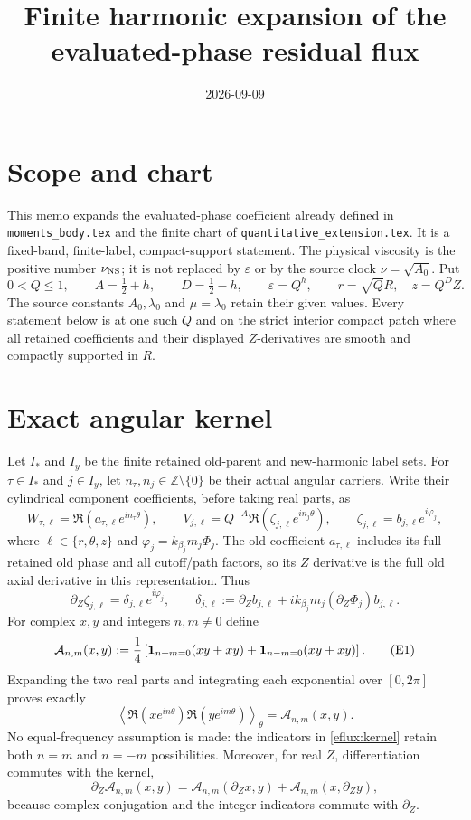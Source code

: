 \documentclass[11pt]{article}
\title{Finite harmonic expansion of the evaluated-phase residual flux}
\author{}
\date{2026-09-09}
\begin{document}
\maketitle
\small
\section{Scope and chart}
This memo expands the evaluated-phase coefficient already defined in
\texttt{moments\_body.tex} and the finite chart of
\texttt{quantitative\_extension.tex}.  It is a fixed-band, finite-label,
compact-support statement.  The physical viscosity is the positive number
$\nu_{\rm NS}$; it is not replaced by $\varepsilon$ or by the source clock
$\nu=\sqrt{A_0}$.  Put
\[
 0<Q\leq1,\qquad A=\tfrac12+h,\qquad D=\tfrac12-h,
 \qquad \varepsilon=Q^h,
 \qquad r=\sqrt Q R,\quad z=Q^D Z.
\]
The source constants $A_0,\lambda_0$ and $\mu=\lambda_0$ retain their given
values.  Every statement below is at one such $Q$ and on the strict interior
compact patch where all retained coefficients and their displayed
$Z$-derivatives are smooth and compactly supported in $R$.

\section{Exact angular kernel}
Let $I_*$ and $I_y$ be the finite retained old-parent and new-harmonic label
sets.  For $\tau\in I_*$ and $j\in I_y$, let $n_\tau,n_j\in\mathbb Z\setminus\{0\}$
be their actual angular carriers.  Write their cylindrical component
coefficients, before taking real parts, as
\[
 W_{\tau,\ell}=\Re(a_{\tau,\ell}e^{in_\tau\theta}),\qquad
 V_{j,\ell}=Q^{-A}\Re(\zeta_{j,\ell}e^{in_j\theta}),
 \qquad \zeta_{j,\ell}=b_{j,\ell}e^{i\varphi_j},
\]
where $\ell\in\{r,\theta,z\}$ and
$\varphi_j=k_{\beta_j}m_j\Phi_j$.  The old coefficient $a_{\tau,\ell}$ includes its full retained old phase and all cutoff/path factors, so its $Z$ derivative is the full old axial derivative in this representation.  Thus
\[
 \partial_Z\zeta_{j,\ell}=\delta_{j,\ell}e^{i\varphi_j},
 \qquad
 \delta_{j,\ell}:=\partial_Zb_{j,\ell}
       +ik_{\beta_j}m_j(\partial_Z\Phi_j)b_{j,\ell}.
\]
For complex $x,y$ and integers $n,m\ne0$ define
\[
 \mathcal A_{n,m}(x,y):=\frac14\left[
 {\bf1}_{n+m=0}(xy+\bar x\bar y)
 +{\bf1}_{n-m=0}(x\bar y+\bar x y)\right].
 \tag{E1}\label{eflux:kernel}
\]
Expanding the two real parts and integrating each exponential over
$[0,2\pi]$ proves exactly
\[
 \left\langle\Re(xe^{in\theta})\Re(ye^{im\theta})\right\rangle_\theta
 =\mathcal A_{n,m}(x,y).
 \tag{E2}\label{eflux:angular}
\]
No equal-frequency assumption is made: the indicators in
\eqref{eflux:kernel} retain both $n=m$ and $n=-m$ possibilities.  Moreover,
for real $Z$, differentiation commutes with the kernel,
\[
 \partial_Z\mathcal A_{n,m}(x,y)=
 \mathcal A_{n,m}(\partial_Zx,y)+\mathcal A_{n,m}(x,\partial_Zy),
 \tag{E3}\label{eflux:kernel-derivative}
\]
because complex conjugation and the integer indicators commute with
$\partial_Z$.
\end{document}
